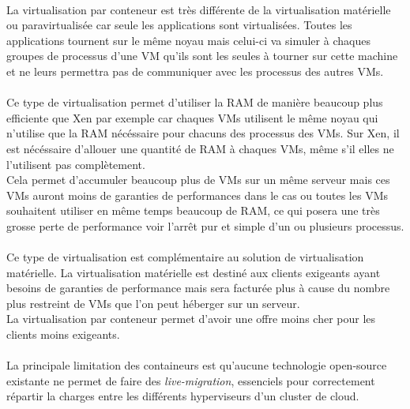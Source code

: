 \paragraph*{}
La virtualisation par conteneur est très différente de la virtualisation matérielle ou paravirtualisée car seule les applications sont virtualisées.
Toutes les applications tournent sur le même noyau mais celui-ci va simuler à chaques groupes de processus d'une VM qu'ils sont les seules à tourner sur
cette machine et ne leurs permettra pas de communiquer avec les processus des autres VMs.

\paragraph*{}
Ce type de virtualisation permet d'utiliser la RAM de manière beaucoup plus efficiente que Xen par exemple car chaques VMs utilisent le même noyau qui n'utilise
que la RAM nécéssaire pour chacuns des processus des VMs. Sur Xen, il est nécéssaire d'allouer une quantité de RAM à chaques VMs, même s'il elles ne l'utilisent pas complètement.
\\
Cela permet d'accumuler beaucoup plus de VMs sur un même serveur mais ces VMs auront moins de garanties de performances dans le cas ou toutes les VMs souhaitent utiliser
en même temps beaucoup de RAM, ce qui posera une très grosse perte de performance voir l'arrêt pur et simple d'un ou plusieurs processus.

\paragraph*{}
Ce type de virtualisation est complémentaire au solution de virtualisation matérielle. La virtualisation matérielle est destiné aux clients exigeants ayant besoins de garanties
de performance mais sera facturée plus à cause du nombre plus restreint de VMs que l'on peut héberger sur un serveur.
\\
La virtualisation par conteneur permet d'avoir une offre moins cher pour les clients moins exigeants.

\paragraph*{}
La principale limitation des containeurs est qu'aucune technologie open-source existante ne permet de faire des \emph{live-migration}, essenciels pour correctement répartir
la charges entre les différents hyperviseurs d'un cluster de cloud.


